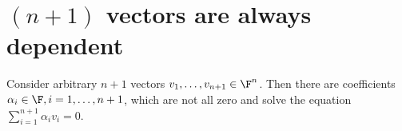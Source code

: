 \section{$(n+1)$ vectors are always dependent}

 Consider arbitrary $n+1$ vectors $v_1,\ldots,v_{n+1}\in\F^n$. Then there are coefficients $\alpha_i\in\F, i=1,\ldots ,n+1$, which are not all zero and solve the equation $\sum_{i=1}^{n+1}\alpha_iv_i=0$.  
 
 
 

 
